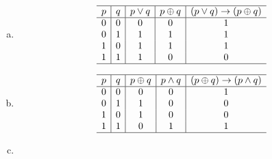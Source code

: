 {{        %
        \begin{practices}
            \begin{enumerate}[a)]
                \item
                {
                    \begin{table}[H]
                        \[
                            \begin{array}{c|c|c|c|c}
                                \hline
                                p & q & p \vee q & p \oplus q & (p \vee q) \rightarrow (p \oplus q)\\
                                \hline
                                0 & 0 & 0 & 0 & 1 \\
                                0 & 1 & 1 & 1 & 1 \\
                                1 & 0 & 1 & 1 & 1 \\
                                1 & 1 & 1 & 0 & 0 \\
                                \hline
                            \end{array}
                        \]
                    \end{table}
                }
                \item
                {
                    \begin{table}[H]
                        \[
                            \begin{array}{c|c|c|c|c}
                                \hline
                                p & q & p \oplus q & p \wedge q & (p \oplus q) \rightarrow (p \wedge q)\\
                                \hline
                                0 & 0 & 0 & 0 & 1 \\
                                0 & 1 & 1 & 0 & 0 \\
                                1 & 0 & 1 & 0 & 0 \\
                                1 & 1 & 0 & 1 & 1 \\
                                \hline
                            \end{array}
                        \]
                    \end{table}
                }
                \item
                {
                    \begin{table}[H]
                        \[
                            \begin{array}{c|c|c|c|c}

\end{array}\]
\end{table}}
\end{enumerate}
\end{practices}}}
